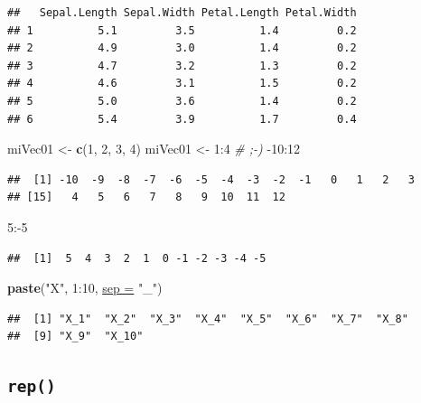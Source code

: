 \documentclass[twoside,symmetric]{book}
\newenvironment{Shaded}{}{}
\newcommand{\CommentTok}[1]{\textit{#1}}
\newcommand{\DataTypeTok}[1]{\underline{#1}}
\newcommand{\DecValTok}[1]{#1}
\newcommand{\KeywordTok}[1]{\textbf{#1}}
\newcommand{\NormalTok}[1]{#1}
\newcommand{\OperatorTok}[1]{#1}
\newcommand{\StringTok}[1]{#1}
\begin{document}
\begin{verbatim}
##   Sepal.Length Sepal.Width Petal.Length Petal.Width
## 1          5.1         3.5          1.4         0.2
## 2          4.9         3.0          1.4         0.2
## 3          4.7         3.2          1.3         0.2
## 4          4.6         3.1          1.5         0.2
## 5          5.0         3.6          1.4         0.2
## 6          5.4         3.9          1.7         0.4
\end{verbatim}

\begin{Shaded}
\begin{Highlighting}[]
\NormalTok{miVec01 <-}\StringTok{ }\KeywordTok{c}\NormalTok{(}\DecValTok{1}\NormalTok{, }\DecValTok{2}\NormalTok{, }\DecValTok{3}\NormalTok{, }\DecValTok{4}\NormalTok{)}
\NormalTok{miVec01 <-}\StringTok{ }\DecValTok{1}\OperatorTok{:}\DecValTok{4} \CommentTok{# ;-)}
\DecValTok{-10}\OperatorTok{:}\DecValTok{12}
\end{Highlighting}
\end{Shaded}

\begin{verbatim}
##  [1] -10  -9  -8  -7  -6  -5  -4  -3  -2  -1   0   1   2   3
## [15]   4   5   6   7   8   9  10  11  12
\end{verbatim}

\begin{Shaded}
\begin{Highlighting}[]
\DecValTok{5}\OperatorTok{:-}\DecValTok{5}
\end{Highlighting}
\end{Shaded}

\begin{verbatim}
##  [1]  5  4  3  2  1  0 -1 -2 -3 -4 -5
\end{verbatim}

\begin{Shaded}
\begin{Highlighting}[]
\KeywordTok{paste}\NormalTok{(}\StringTok{"X"}\NormalTok{, }\DecValTok{1}\OperatorTok{:}\DecValTok{10}\NormalTok{, }\DataTypeTok{sep =} \StringTok{"_"}\NormalTok{)}
\end{Highlighting}
\end{Shaded}

\begin{verbatim}
##  [1] "X_1"  "X_2"  "X_3"  "X_4"  "X_5"  "X_6"  "X_7"  "X_8" 
##  [9] "X_9"  "X_10"
\end{verbatim}

\hypertarget{l015rep}{%
\subsection{\texorpdfstring{\texttt{rep()}}{rep()}}\label{l015rep}}
\end{document}
